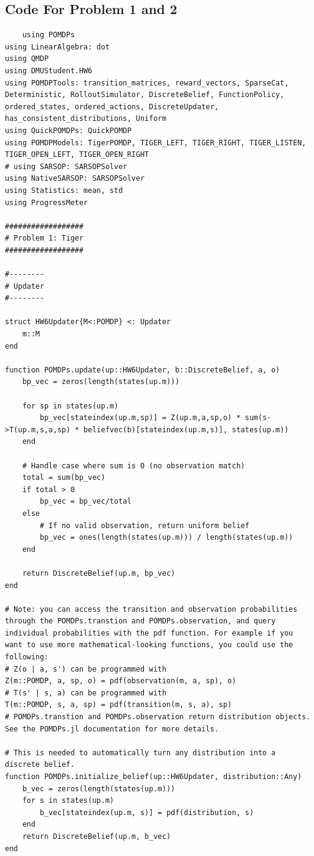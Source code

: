 \documentclass[11pt]{article}
\begin{document}
\subsection{Code For Problem 1 and 2}
\begin{lstlisting}
    using POMDPs
using LinearAlgebra: dot
using QMDP
using DMUStudent.HW6
using POMDPTools: transition_matrices, reward_vectors, SparseCat, Deterministic, RolloutSimulator, DiscreteBelief, FunctionPolicy, ordered_states, ordered_actions, DiscreteUpdater, has_consistent_distributions, Uniform
using QuickPOMDPs: QuickPOMDP
using POMDPModels: TigerPOMDP, TIGER_LEFT, TIGER_RIGHT, TIGER_LISTEN, TIGER_OPEN_LEFT, TIGER_OPEN_RIGHT
# using SARSOP: SARSOPSolver
using NativeSARSOP: SARSOPSolver
using Statistics: mean, std
using ProgressMeter

##################
# Problem 1: Tiger
##################

#--------
# Updater
#--------

struct HW6Updater{M<:POMDP} <: Updater
    m::M
end

function POMDPs.update(up::HW6Updater, b::DiscreteBelief, a, o)
    bp_vec = zeros(length(states(up.m)))
    
    for sp in states(up.m)
        bp_vec[stateindex(up.m,sp)] = Z(up.m,a,sp,o) * sum(s->T(up.m,s,a,sp) * beliefvec(b)[stateindex(up.m,s)], states(up.m))
    end
    
    # Handle case where sum is 0 (no observation match)
    total = sum(bp_vec)
    if total > 0
        bp_vec = bp_vec/total
    else
        # If no valid observation, return uniform belief
        bp_vec = ones(length(states(up.m))) / length(states(up.m))
    end
    
    return DiscreteBelief(up.m, bp_vec)
end

# Note: you can access the transition and observation probabilities through the POMDPs.transtion and POMDPs.observation, and query individual probabilities with the pdf function. For example if you want to use more mathematical-looking functions, you could use the following:
# Z(o | a, s') can be programmed with
Z(m::POMDP, a, sp, o) = pdf(observation(m, a, sp), o)
# T(s' | s, a) can be programmed with
T(m::POMDP, s, a, sp) = pdf(transition(m, s, a), sp)
# POMDPs.transtion and POMDPs.observation return distribution objects. See the POMDPs.jl documentation for more details.

# This is needed to automatically turn any distribution into a discrete belief.
function POMDPs.initialize_belief(up::HW6Updater, distribution::Any)
    b_vec = zeros(length(states(up.m)))
    for s in states(up.m)
        b_vec[stateindex(up.m, s)] = pdf(distribution, s)
    end
    return DiscreteBelief(up.m, b_vec)
end


\end{lstlisting}
\end{document}
